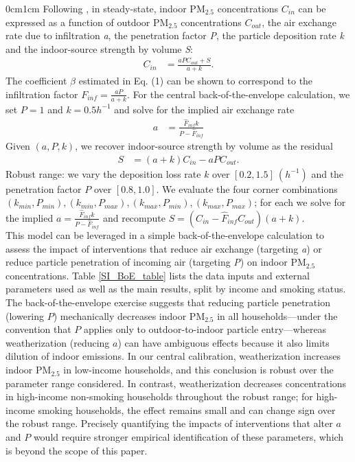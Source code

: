 \documentclass[9pt,twoside]{pnas-new}
\begin{document}
\begin{adjustwidth}{0cm}{1cm}
Following \citep{chen_review_2011}, in steady-state, indoor PM$_{2.5}$ concentrations $C_{in}$ can be expressed as a function of outdoor PM$_{2.5}$ concentrations $C_{out}$, the air exchange rate due to infiltration \textit{a}, the penetration factor \textit{P}, the particle deposition rate \textit{k} and the indoor-source strength by volume \textit{S}:
\begin{align*}
    C_{in} &= \frac{a P C_{out} +S}{a+k}.
\end{align*}
The coefficient $\beta$ estimated in Eq. (1)  can be shown to correspond to the infiltration factor $F_{inf} = \frac{a P}{a + k}$. For the central back-of-the-envelope calculation, we set $P = 1$ and $k = 0.5 h^{-1}$ and solve for the implied air exchange rate
\begin{align}
    a &= \frac{\hat{F}_{inf} k}{P - \hat{F}_{inf}}
\end{align}
Given $(a, P, k)$, we recover indoor-source strength by volume as the residual
\begin{align*}
    S &= (a + k) C_{in} - a P C_{out}.
\end{align*}
Robust range: we vary the deposition loss rate $k$ over $[0.2, 1.5]~(h^{-1})$ and the penetration factor $P$ over $[0.8, 1.0]$. We evaluate the four corner combinations $(k_{min}, P_{min}), (k_{min}, P_{max}), (k_{max}, P_{min}), (k_{max}, P_{max})$; for each we solve for the implied $a=\frac{\hat F_{inf}k}{P-\hat F_{inf}}$ and recompute $S=(C_{in}-\hat F_{inf}C_{out})(a+k)$.
\\

This model can be leveraged in a simple back-of-the-envelope calculation to assess the impact of interventions that reduce air exchange (targeting \textit{a}) or reduce particle penetration of incoming air (targeting \textit{P}) on indoor PM$_{2.5}$ concentrations. Table \ref{SI_BoE_table} lists the data inputs and external parameters used as well as the main results, split by income and smoking status.
\\

The back-of-the-envelope exercise suggests that reducing particle penetration (lowering $P$) mechanically decreases indoor PM$_{2.5}$ in all households—under the convention that $P$ applies only to outdoor-to-indoor particle entry—whereas weatherization (reducing $a$) can have ambiguous effects because it also limits dilution of indoor emissions. In our central calibration, weatherization increases indoor PM$_{2.5}$ in low-income households, and this conclusion is robust over the parameter range considered. In contrast, weatherization decreases concentrations in high-income non-smoking households throughout the robust range; for high-income smoking households, the effect remains small and can change sign over the robust range. Precisely quantifying the impacts of interventions that alter $a$ and $P$ would require stronger empirical identification of these parameters, which is beyond the scope of this paper.


\end{adjustwidth}
\end{document}
